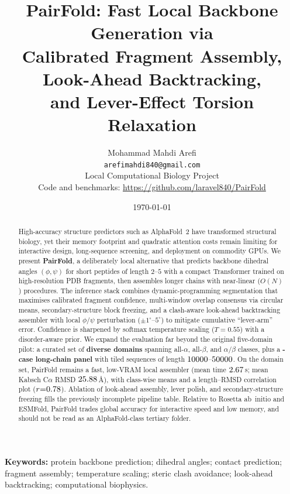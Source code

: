 \documentclass[11pt,a4paper]{article}
\title{%
  PairFold: Fast Local Backbone Generation via\\
  Calibrated Fragment Assembly, Look-Ahead Backtracking,\\
  and Lever-Effect Torsion Relaxation%
}
\author{%
  Mohammad Mahdi Arefi\\
  \texttt{arefimahdi840@gmail.com}\\
  Local Computational Biology Project\\
  \small Code and benchmarks:
  \url{https://github.com/laravel840/PairFold}
}
\date{\today}
\begin{document}
\maketitle

\begin{abstract}
High-accuracy structure predictors such as AlphaFold~2 have transformed structural biology, yet their memory footprint and quadratic attention costs remain limiting for interactive design, long-sequence screening, and deployment on commodity GPUs.
We present \textbf{PairFold}, a deliberately local alternative that predicts backbone dihedral angles $(\phi,\psi)$ for short peptides of length $2$--$5$ with a compact Transformer trained on high-resolution PDB fragments, then assembles longer chains with near-linear ($O(N)$) procedures.
The inference stack combines dynamic-programming segmentation that maximises calibrated fragment confidence, multi-window overlap consensus via circular means, secondary-structure block freezing, and a clash-aware look-ahead backtracking assembler with local $\phi/\psi$ perturbation ($\pm 1^\circ$--$5^\circ$) to mitigate cumulative ``lever-arm'' error.
Confidence is sharpened by softmax temperature scaling ($T{=}0.55$) with a disorder-aware prior.
We expand the evaluation far beyond the original five-domain pilot: a curated set of \textbf{\PFDomainN{} diverse domains} spanning all-$\alpha$, all-$\beta$, and $\alpha/\beta$ classes, plus a \textbf{\PFLongN{}-case long-chain panel} with tiled sequences of length $10000{}$--$50000{}$.
On the domain set, PairFold remains a fast, low-VRAM local assembler (mean time $2.67{}$\,s; mean Kabsch C$\alpha$ RMSD $25.88{}$\,\AA), with class-wise means and a length--RMSD correlation plot ($r{=}0.78{}$).
Ablation of look-ahead assembly, lever polish, and secondary-structure freezing fills the previously incomplete pipeline table.
Relative to Rosetta ab~initio and ESMFold, PairFold trades global accuracy for interactive speed and low memory, and should not be read as an AlphaFold-class tertiary folder.
\end{abstract}

\noindent\textbf{Keywords:}
protein backbone prediction;
dihedral angles;
contact prediction;
fragment assembly;
temperature scaling;
steric clash avoidance;
look-ahead backtracking;
computational biophysics.

\end{document}

